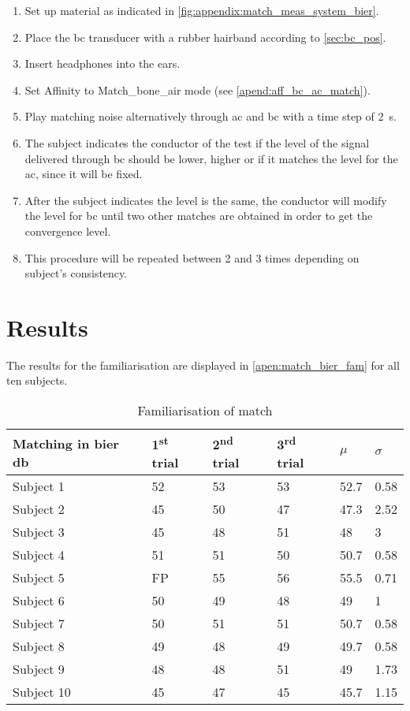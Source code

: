 \begin{enumerate}
\item Set up material as indicated in \autoref{fig:appendix:match_meas_system_bier}.
\item Place the \gls{bc} transducer with a rubber hairband according to \autoref{sec:bc_pos}.
\item Insert headphones into the ears.
\item Set Affinity to Match_bone_air mode (see \autoref{apend:aff_bc_ac_match}).
\item Play matching noise alternatively through \gls{ac} and \gls{bc} with a time step of \SI{2}{\second}.
\item The  subject indicates the conductor of the test if the level of the signal delivered through \gls{bc} should be lower, higher or if it matches the level for the \gls{ac}, since it will be fixed.
\item After the subject indicates the level is the same, the conductor will modify the level for \gls{bc} until two other matches are obtained in order to get the convergence level.
\item This procedure will be repeated between 2 and 3 times depending on subject's consistency.
\end{enumerate}

\section*{Results}

The results for the familiarisation are displayed in \autoref{apen:match_bier_fam} for all ten subjects. 

\begin{table}[H]
\centering
\caption{Familiarisation of match}
\begin{tabular}{l|lll|ll}
Matching in bier \si{\decibel}  &1\textsuperscript{st} trial & 2\textsuperscript{nd} trial & 3\textsuperscript{rd} trial & $\mu$   & $\sigma$ \\ \hline
Subject 1           & 52    & 53    & 53    & 52.7 & 0.58  \\
Subject 2          & 45    & 50    & 47    & 47.3 & 2.52   \\
Subject 3           & 45    & 48    & 51    & 48   & 3     \\
Subject 4           & 51    & 51    & 50    & 50.7 & 0.58  \\
Subject 5           & FP    & 55    & 56    & 55.5   & 0.71  \\
Subject 6           & 50    & 49    & 48    & 49   & 1     \\
Subject 7           & 50    & 51    & 51    & 50.7 & 0.58  \\
Subject 8           & 49    & 48    & 49    & 49.7 & 0.58  \\
Subject 9           & 48    & 48    & 51    & 49   & 1.73  \\
Subject 10          & 45    & 47    & 45    & 45.7 & 1.15  \\
\end{tabular}
\label{apen:match_bier_fam} 
\end{table}

